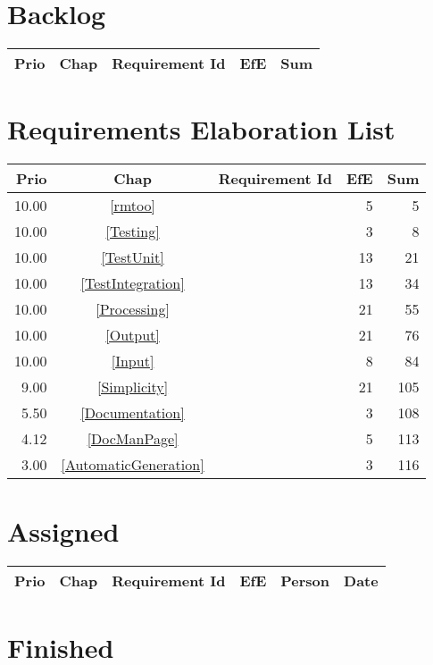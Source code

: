 \section{Backlog}
\begin{longtable}{|r|c|p{7cm}||r|r|} \hline
\textbf{Prio} & \textbf{Chap} & \textbf{Requirement Id} & \textbf{EfE} & \textbf{Sum} \\ \hline\endhead
\end{longtable}\section{Requirements Elaboration List}
\begin{longtable}{|r|c|p{7cm}||r|r|} \hline
\textbf{Prio} & \textbf{Chap} & \textbf{Requirement Id} & \textbf{EfE} & \textbf{Sum} \\ \hline\endhead
10.00 & \ref{rmtoo} & \nameref{rmtoo} & 5 & 5 \\ \hline
10.00 & \ref{Testing} & \nameref{Testing} & 3 & 8 \\ \hline
10.00 & \ref{TestUnit} & \nameref{TestUnit} & 13 & 21 \\ \hline
10.00 & \ref{TestIntegration} & \nameref{TestIntegration} & 13 & 34 \\ \hline
10.00 & \ref{Processing} & \nameref{Processing} & 21 & 55 \\ \hline
10.00 & \ref{Output} & \nameref{Output} & 21 & 76 \\ \hline
10.00 & \ref{Input} & \nameref{Input} & 8 & 84 \\ \hline
9.00 & \ref{Simplicity} & \nameref{Simplicity} & 21 & 105 \\ \hline
5.50 & \ref{Documentation} & \nameref{Documentation} & 3 & 108 \\ \hline
4.12 & \ref{DocManPage} & \nameref{DocManPage} & 5 & 113 \\ \hline
3.00 & \ref{AutomaticGeneration} & \nameref{AutomaticGeneration} & 3 & 116 \\ \hline
\end{longtable}\section{Assigned}
\begin{longtable}{|r|c|p{6.5cm}||r|l|l|} \hline
\textbf{Prio} & \textbf{Chap} & \textbf{Requirement Id} & \textbf{EfE} & \textbf{Person} & \textbf{Date} \\ \hline\endhead
\end{longtable}\section{Finished}
